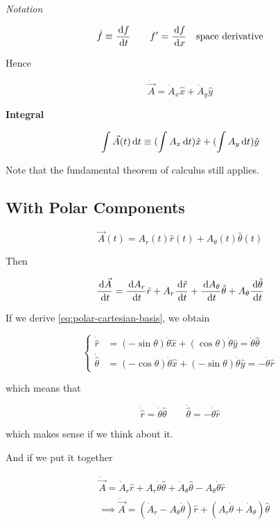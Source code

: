\textit{Notation}

\begin{equation}
	\dot f \equiv \frac{\D f}{\D t} \qquad f' = \frac{\D f}{\D x} \quad \text{space derivative}
\end{equation}

Hence

\begin{equation}
	\dot{\vec{A}} = \dot A_x \hat x + \dot A_y \hat y
\end{equation}

\textbf{Integral}

\begin{equation}
	\int \vec A(t) \D t \equiv (\int A_x \D t) \hat x + (\int A_y \D t) \hat y
\end{equation}

Note that the fundamental theorem of calculus still applies.

\subsection{With Polar Components}

\begin{equation}
	\vec A(t) = A_r(t) \hat r(t) + A_\theta(t) \hat \theta(t)
\end{equation}

Then

\begin{equation}
	\frac{\D \vec A}{\D t} = \frac{\D A_r}{\D t} \hat r + A_r \frac{\D \hat r}{\D t} + \frac{\D A_\theta}{\D t} \hat \theta + A_\theta \frac{\D \hat\theta}{\D t}
\end{equation}

If we derive \cref*{eq:polar-cartesian-basis}, we obtain

\begin{equation}
	\begin{cases}
		\dot{\hat{r}} &= (-\sin\theta) \dot\theta \hat x + (\cos\theta) \dot\theta \hat y = \dot\theta \hat\theta\\
		\dot{\hat{\theta}} &= (-\cos\theta)\dot\theta \hat x + (-\sin\theta) \dot\theta \hat y = -\dot\theta \hat r
	\end{cases}
\end{equation}

which means that

\begin{equation}
	\dot{\hat{r}} = \dot\theta \hat\theta \qquad \dot{\hat{\theta}} = - \dot\theta \hat r
\end{equation}

which makes sense if we think about it.

And if we put it together

\begin{align}
	&\dot{\vec{A}} = \dot A_r \hat r + A_r \dot\theta \hat\theta + \dot A_\theta \hat\theta - A_\theta \dot\theta \hat r\\
	&\implies \dot{\vec{A}} = (\dot A_r - A_\theta \dot\theta) \hat r + (A_r \dot\theta + \dot A_\theta) \hat \theta
\end{align}